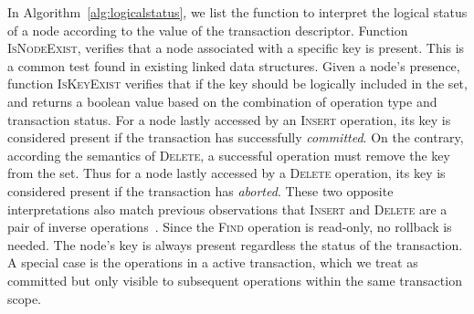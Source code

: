 \documentclass[10pt,conference,compsocconf]{IEEEtran}
\begin{document}
In Algorithm~\ref{alg:logicalstatus}, we list the function to interpret the logical status of a node according to the value of the transaction descriptor.
Function \textsc{IsNodeExist}, verifies that a node associated with a specific key is present.
This is a common test found in existing linked data structures.
Given a node's presence, function \textsc{IsKeyExist} verifies that if the key should be logically included in the set, and returns a boolean value based on the combination of operation type and transaction status.
For a node lastly accessed by an \textsc{Insert} operation, its key is considered present if the transaction has successfully \emph{committed}.
On the contrary, according the semantics of \textsc{Delete}, a successful operation must remove the key from the set.
Thus for a node lastly accessed by a \textsc{Delete} operation, its key is considered present if the transaction has \emph{aborted}.
These two opposite interpretations also match previous observations that \textsc{Insert} and \textsc{Delete} are a pair of inverse operations~\cite{herlihy2008transactional}.
Since the \textsc{Find} operation is read-only, no rollback is needed.
The node's key is always present regardless the status of the transaction.
A special case is the operations in a active transaction, which we treat as committed but only visible to subsequent operations within the same transaction scope.

\end{document}
